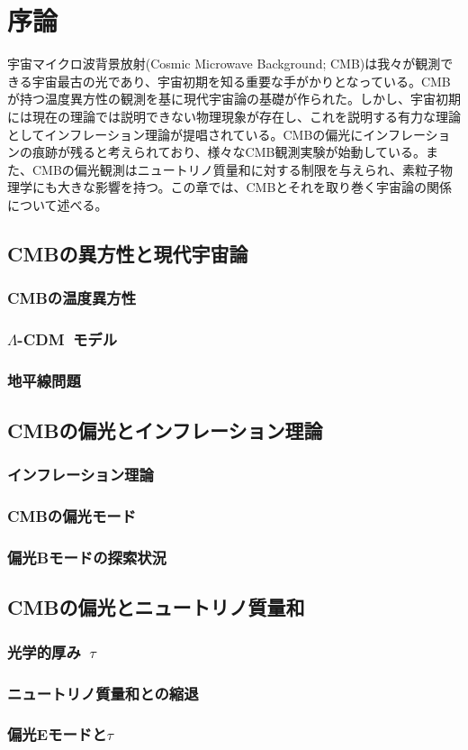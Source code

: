 \chapter{序論}
\label{chapter1}
宇宙マイクロ波背景放射(Cosmic Microwave Background; CMB)は我々が観測できる宇宙最古の光であり、宇宙初期を知る重要な手がかりとなっている。CMBが持つ温度異方性の観測を基に現代宇宙論の基礎が作られた。しかし、宇宙初期には現在の理論では説明できない物理現象が存在し、これを説明する有力な理論としてインフレーション理論が提唱されている。CMBの偏光にインフレーションの痕跡が残ると考えられており、様々なCMB観測実験が始動している。また、CMBの偏光観測はニュートリノ質量和に対する制限を与えられ、素粒子物理学にも大きな影響を持つ。この章では、CMBとそれを取り巻く宇宙論の関係について述べる。

\section{CMBの異方性と現代宇宙論}

\subsection{CMBの温度異方性}

\subsection{$\Lambda$-CDM~モデル}

\subsection{地平線問題}

\section{CMBの偏光とインフレーション理論}

\subsection{インフレーション理論}

\subsection{CMBの偏光モード}

\subsection{偏光Bモードの探索状況}

\section{CMBの偏光とニュートリノ質量和}

\subsection{光学的厚み~$\tau$}

\subsection{ニュートリノ質量和との縮退}

\subsection{偏光Eモードと$\tau$}
\label{E_and_tau}
